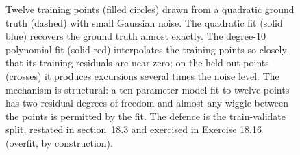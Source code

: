 \begin{figure}[htbp]
\caption[Overfit: a polynomial that fits the data but fails on
prediction]{Twelve training points (filled circles) drawn from a
quadratic ground truth (dashed) with small Gaussian noise. The
quadratic fit (solid blue) recovers the ground truth almost
exactly. The degree-10 polynomial fit (solid red) interpolates the
training points so closely that its training residuals are
near-zero; on the held-out points (crosses) it produces excursions
several times the noise level. The mechanism is structural: a
ten-parameter model fit to twelve points has two residual degrees
of freedom and almost any wiggle between the points is permitted
by the fit. The defence is the train-validate split, restated in
section~18.3 and exercised in Exercise 18.16 (overfit, by
construction).}
\label{fig:vol02:ch18:overfit}
\end{figure}
